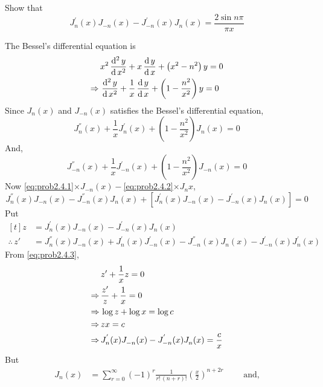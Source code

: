 \documentclass[../main-sheet.tex]{subfiles}
\begin{document}
\begin{prob}
    Show that 
    \[
        J_n^{'}(x)J_{-n}(x)-J_{-n}^{'}(x)J_{n}(x)=\frac{2\sin n\pi }{\pi x}
    \]
\end{prob}
\begin{soln}
    The Bessel's differential equation is
    \begin{align*}
        &x^2\,\frac{\mathrm{d}^{2}\, y}{\mathrm{d}\, x^{2}}+x\,\frac{\mathrm{d}\,y}{\mathrm{d}\,x}+\left( x^2-n^2 \right)y=0\\
        \Rightarrow\,& \,\frac{\mathrm{d}^{2}\, y}{\mathrm{d}\, x^{2}}+\frac{1}{x}\,\frac{\mathrm{d}\,y}{\mathrm{d}\,x}+\left( 1-\frac{n^2}{x^2} \right)y=0
    \end{align*}
    Since $ J_n(x) $ and $ J_{-n} (x)$ satisfies the Bessel's differential equation,
    \begin{equation}
        J_n^{''}(x)+\frac{1}{x}J_n^{'}(x)+\left( 1-\frac{n^2}{x^2} \right)J_n(x)=0\label{eq:prob2.4.1}
    \end{equation}
    And,
    \begin{equation}
        J_{-n}^{''}(x)+\frac{1}{x}J_{-n}^{'}(x)+\left( 1-\frac{n^2}{x^2} \right)J_{-n}(x)=0\label{eq:prob2.4.2}
    \end{equation}
    Now \eqref{eq:prob2.4.1}$ \times J_{-n}(x) - $\eqref{eq:prob2.4.2}$ \times J_n{x} $,
    \begin{equation}
        J_n^{''}(x)J_{-n}(x)-J_{-n}^{''}(x)J_{n}(x)+\left[ J_n^{'}(x)J_{-n}(x)-J_{-n}^{'}(x)J_{n}(x) \right]=0\label{eq:prob2.4.3}
    \end{equation}
    Put $ \begin{aligned}[t]
        z&=J_{n}^{'}(x)J_{-n}^{}(x)-J_{-n}^{'}(x)J_{n}^{}(x)\\
        \therefore\, z'&=J_{n}^{''}(x)J_{-n}^{}(x)+J_{n}^{'}(x)J_{-n}^{'}(x)-J_{-n}^{''}(x)J_{n}^{}(x)-J_{-n}^{'}(x)J_{n}^{'}(x)
    \end{aligned} $\\
    From \eqref{eq:prob2.4.3},
    \begin{align}
        & z'+\frac{1}{x}z=0\notag\\
        \Rightarrow\,& \frac{z'}{z}+\frac{1}{x}=0\notag\\
        \Rightarrow\, & \log z+\log x=\log c\notag\\
        \Rightarrow\, & zx=c\notag\\
        \Rightarrow\, & J_{n}^{'}(x)J_{-n}^{}(x)-J_{-n}^{'}(x)J_{n}^{}(x)=\frac{c}{x}\label{eq:prob2.4.4}
    \end{align}
    But 
    \begin{align*}
        J_n(x)&=\sum_{r=0}^\infty (-1)^r \frac{1}{r!\,(n+r)!}\left( \frac{x}{2} \right)^{n+2r}\qquad\text{ and,}\\

\end{align*}
\end{soln}
\end{document}
